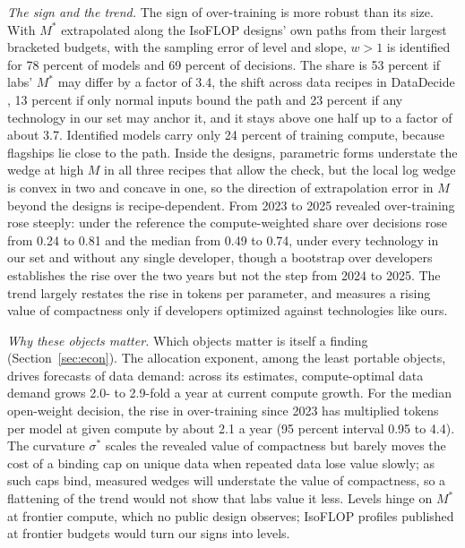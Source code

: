 \textit{The sign and the trend.} The sign of over-training is more robust than its size. With $M^*$ extrapolated along
the IsoFLOP designs' own paths from their largest bracketed budgets, with the sampling error of level and slope, $w>1$
is identified for 78 percent of models and 69 percent of decisions. The share is 53 percent if labs' $M^*$ may differ
by a factor of 3.4, the shift across data recipes in DataDecide \citep{magnusson2025datadecide}, 13 percent if only
normal inputs bound the path and 23 percent if any technology in our set may anchor it, and it stays above one half up
to a factor of about 3.7. Identified models carry only 24 percent of training compute, because flagships lie close to
the path. Inside the designs, parametric forms understate the wedge at high $M$ in all three recipes that allow the
check, but the local log wedge is convex in two and concave in one, so the direction of extrapolation error in $M$
beyond the designs is recipe-dependent. From 2023 to 2025 revealed over-training rose steeply: under the reference the
compute-weighted share over decisions rose from 0.24 to 0.81 and the median from 0.49 to 0.74, under every technology
in our set and without any single developer, though a bootstrap over developers establishes the rise over the two
years but not the step from 2024 to 2025. The trend largely restates the rise in tokens per parameter, and measures a
rising value of compactness only if developers optimized against technologies like ours.

\textit{Why these objects matter.} Which objects matter is itself a finding (Section~\ref{sec:econ}). The allocation
exponent, among the least portable objects, drives forecasts of data demand: across its estimates, compute-optimal
data demand grows 2.0- to 2.9-fold a year at current compute growth. For the median open-weight decision, the rise in
over-training since 2023 has multiplied tokens per model at given compute by about 2.1 a year (95 percent interval
0.95 to 4.4). The curvature $\sigma^*$ scales the revealed value of compactness but barely moves the cost of a binding
cap on unique data when repeated data lose value slowly; as such caps bind, measured wedges will understate the value
of compactness, so a flattening of the trend would not show that labs value it less. Levels hinge on $M^*$ at frontier
compute, which no public design observes; IsoFLOP profiles published at frontier budgets would turn our signs into
levels.

